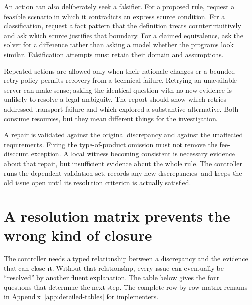 
An action can also deliberately seek a falsifier. For a proposed rule, request a
feasible scenario in which it contradicts an express source condition. For a
classification, request a fact pattern that the definition treats counterintuitively
and ask which source justifies that boundary. For a claimed equivalence, ask the
solver for a difference rather than asking a model whether the programs look
similar. Falsification attempts must retain their domain and assumptions.

Repeated actions are allowed only when their rationale changes or a bounded retry
policy permits recovery from a technical failure. Retrying an unavailable server
can make sense; asking the identical question with no new evidence is unlikely
to resolve a legal ambiguity. The report should show which retries addressed
transport failure and which explored a substantive alternative. Both consume
resources, but they mean different things for the investigation.

A repair is validated against the original discrepancy and against the unaffected
requirements. Fixing the type-of-product omission must not remove the fee-discount
exception. A local witness becoming consistent is necessary evidence about that
repair, but insufficient evidence about the whole rule. The controller runs the
dependent validation set, records any new discrepancies, and keeps the old issue
open until its resolution criterion is actually satisfied.

\section{A resolution matrix prevents the wrong kind of closure}
\label{merge:M06:09}


The controller needs a typed relationship between a discrepancy and the evidence
that can close it. Without that relationship, every issue can eventually be
``resolved'' by another fluent explanation. The table below gives the four
questions that determine the next step. The complete row-by-row matrix remains
in Appendix~\ref{app:detailed-tables} for implementers.

